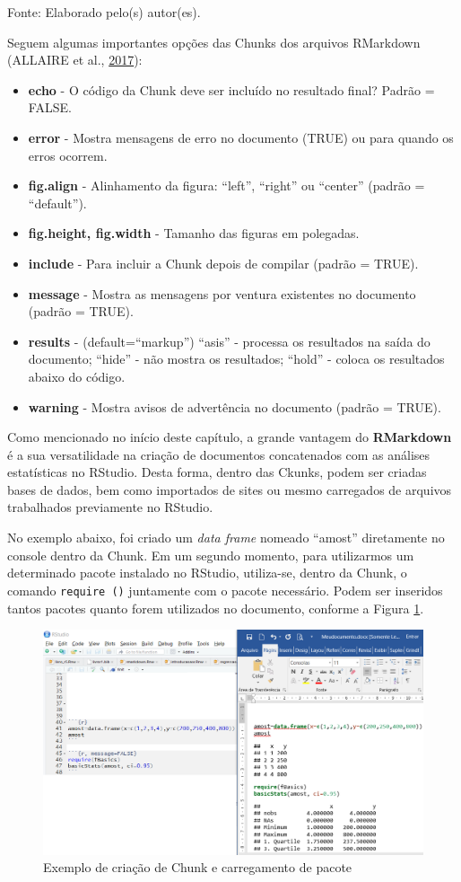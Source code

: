 \documentclass[12pt,brazil,]{book}
\providecommand{\tightlist}{%
  \setlength{\itemsep}{0pt}\setlength{\parskip}{0pt}}
\begin{document}
Fonte: Elaborado pelo(s) autor(es).

Seguem algumas importantes opções das Chunks dos arquivos RMarkdown
(ALLAIRE et al., \protect\hyperlink{ref-R-rmarkdown}{2017}):

\begin{itemize}
\tightlist
\item
  \textbf{echo} - O código da Chunk deve ser incluído no resultado
  final? Padrão = FALSE.
\item
  \textbf{error} - Mostra mensagens de erro no documento (TRUE) ou para
  quando os erros ocorrem.
\item
  \textbf{fig.align} - Alinhamento da figura: ``left'', ``right'' ou
  ``center'' (padrão = ``default'').
\item
  \textbf{fig.height, fig.width} - Tamanho das figuras em polegadas.
\item
  \textbf{include} - Para incluir a Chunk depois de compilar (padrão =
  TRUE).
\item
  \textbf{message} - Mostra as mensagens por ventura existentes no
  documento (padrão = TRUE).
\item
  \textbf{results} - (default=``markup'') ``asis'' - processa os
  resultados na saída do documento; ``hide'' - não mostra os resultados;
  ``hold'' - coloca os resultados abaixo do código.
\item
  \textbf{warning} - Mostra avisos de advertência no documento (padrão =
  TRUE).
\end{itemize}

Como mencionado no início deste capítulo, a grande vantagem do
\textbf{RMarkdown} é a sua versatilidade na criação de documentos
concatenados com as análises estatísticas no RStudio. Desta forma,
dentro das Ckunks, podem ser criadas bases de dados, bem como importados
de sites ou mesmo carregados de arquivos trabalhados previamente no
RStudio.

No exemplo abaixo, foi criado um \emph{data frame} nomeado ``amost''
diretamente no console dentro da Chunk. Em um segundo momento, para
utilizarmos um determinado pacote instalado no RStudio, utiliza-se,
dentro da Chunk, o comando \texttt{require\ ()} juntamente com o pacote
necessário. Podem ser inseridos tantos pacotes quanto forem utilizados
no documento, conforme a Figura \ref{fig:rmarkchunk3}.

\begin{figure}

{\centering \includegraphics[width=0.6\linewidth]{rmarkchunk3} 

}

\caption{Exemplo de criação de Chunk e carregamento de pacote}\label{fig:rmarkchunk3}
\end{figure}
\end{document}
